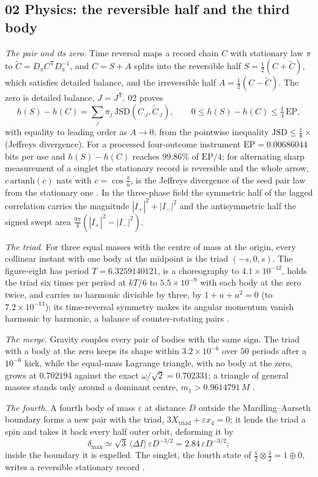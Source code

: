 \documentclass[11pt]{article}
\theoremstyle{definition}\newtheorem{definition}[theorem]{Definition}
\theoremstyle{remark}\newtheorem{remark}[theorem]{Remark}
\begin{document}
\subsection{02 Physics: the reversible half and the third body}\label{sec:f02}
\emph{The pair and its zero.} Time reversal maps a record chain $C$ with stationary law $\pi$ to $\tilde C=D_\pi C^{\mathsf T}D_\pi^{-1}$, and $C=S+A$ splits into the reversible half $S=\frac12(C+\tilde C)$, which satisfies detailed balance, and the irreversible half $A=\frac12(C-\tilde C)$. The zero is detailed balance, $J=J^{\mathsf T}$. 02 proves
\[
h(S)-h(C)=\sum_j\pi_j\,\mathrm{JSD}(C_{\cdot j},\tilde C_{\cdot j}),\qquad 0\le h(S)-h(C)\le\tfrac14\,\mathrm{EP},
\]
with equality to leading order as $A\to0$, from the pointwise inequality $\mathrm{JSD}\le\frac18\times$(Jeffreys divergence). For a processed four-outcome instrument $\mathrm{EP}=0.00686044$ bits per use and $h(S)-h(C)$ reaches $99.86\%$ of $\mathrm{EP}/4$; for alternating sharp measurement of a singlet the stationary record is reversible and the whole arrow, $c\,\mathrm{artanh}(c)$ nats with $c=\cos\frac\pi n$, is the Jeffreys divergence of the seed pair law from the stationary one \cite{SPhys}. In the three-phase field the symmetric half of the lagged correlation carries the magnitude $|I_+|^2+|I_-|^2$ and the antisymmetric half the signed swept area $\frac{9\pi}4(|I_+|^2-|I_-|^2)$.

\emph{The triad.} For three equal masses with the centre of mass at the origin, every collinear instant with one body at the midpoint is the triad $(-s,0,s)$. The figure-eight has period $T=6.3259140121$, is a choreography to $4.1\times10^{-12}$, holds the triad six times per period at $kT/6$ to $5.5\times10^{-9}$ with each body at the zero twice, and carries no harmonic divisible by three, by $1+u+u^2=0$ (to $7.2\times10^{-13}$); its time-reversal symmetry makes its angular momentum vanish harmonic by harmonic, a balance of counter-rotating pairs \cite{SPhys}.

\emph{The merge.} Gravity couples every pair of bodies with the same sign. The triad with a body at the zero keeps its shape within $3.2\times10^{-6}$ over $50$ periods after a $10^{-6}$ kick, while the equal-mass Lagrange triangle, with no body at the zero, grows at $0.702194$ against the exact $\omega/\sqrt2=0.702331$; a triangle of general masses stands only around a dominant centre, $m_1>0.9614791\,M$ \cite{SPhys}.

\emph{The fourth.} A fourth body of mass $\varepsilon$ at distance $D$ outside the Mardling--Aarseth boundary forms a new pair with the triad, $3X_{\mathrm{triad}}+\varepsilon x_4=0$; it lends the triad a spin and takes it back every half outer orbit, deforming it by
\[
\delta_{\max}\simeq\sqrt3\,\langle\Delta I\rangle\,\varepsilon D^{-3/2}=2.84\,\varepsilon D^{-3/2};
\]
inside the boundary it is expelled. The singlet, the fourth state of $\frac12\otimes\frac12=1\oplus0$, writes a reversible stationary record \cite{SPhys}.
\end{document}
